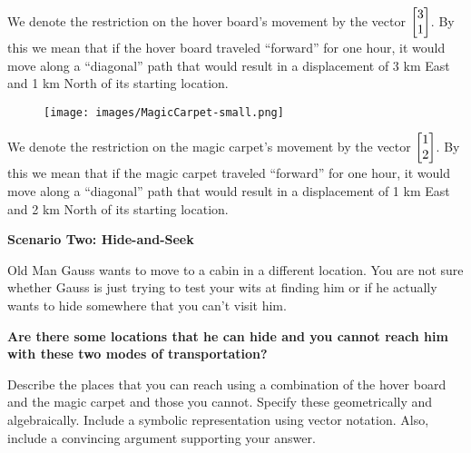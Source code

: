 \begin{iola}
\begin{minipage}{\textwidth}
	We denote the restriction on the hover board's movement by the vector
	$\mat{3 \\1}$. By this we mean that if
	the hover board traveled ``forward'' for one hour, it would move along a
	``diagonal'' path that would result in a displacement of 3 km East and
	1 km North of its starting location.
\end{minipage}

\begin{minipage}{\textwidth}
	\vspace{.5cm}
	\begin{wrapfigure}{l}{1in}
	\vspace{-.8cm}
	\texttt{[image: images/MagicCarpet-small.png]}
	\end{wrapfigure}

	We denote the restriction on the magic carpet's movement by the vector
	$\mat{1 \\2 }$. By this we mean that if the
	magic carpet traveled ``forward'' for one hour, it would move along a
	``diagonal'' path that would result in a displacement of 1 km East and
	2 km North of its starting location.
	\vspace{1cm}
\end{minipage}



\textbf{Scenario Two: Hide-and-Seek}

Old Man Gauss wants to move to a cabin in a different location. You are
not sure whether Gauss is just trying to test your wits at finding him
or if he actually wants to hide somewhere that you can't visit him.

\vspace{5mm}

\textbf{Are there some locations that he can hide and you cannot reach him
with these two modes of transportation?}

Describe the places that you
can reach using a combination of the hover board and the magic carpet and
those you cannot. Specify these geometrically and algebraically. Include
a symbolic representation using vector notation. Also, include a convincing
argument supporting your answer.

\end{iola}







